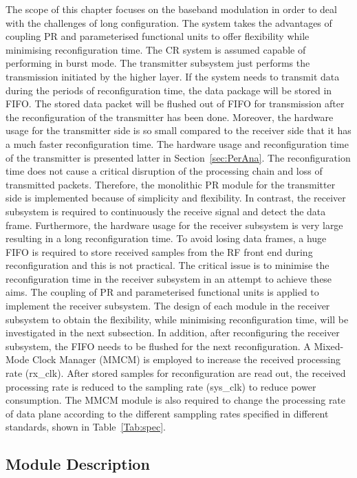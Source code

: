 The scope of this chapter focuses on the baseband modulation in order to deal with the challenges of long configuration. 
The system takes the advantages of coupling PR and parameterised functional units to offer flexibility while minimising reconfiguration time.
The CR system is assumed capable of performing in burst mode. 
The transmitter subsystem just performs the transmission initiated by the higher layer.
If the system needs to transmit data during the periods of reconfiguration time, the data package will be stored in FIFO. 
The stored data packet will be flushed out of FIFO for transmission after the reconfiguration of the transmitter has been done.
Moreover, the hardware usage for the transmitter side is so small compared to the receiver side that it has a much faster reconfiguration time.
The hardware usage and reconfiguration time of the transmitter is presented latter in Section~\ref{sec:PerAna}.
The reconfiguration time does not cause a critical disruption of the processing chain and loss of transmitted packets.
Therefore, the monolithic PR module for the transmitter side is implemented because of simplicity and flexibility.
In contrast, the receiver subsystem is required to continuously the receive signal and detect the data frame.
Furthermore, the hardware usage for the receiver subsystem is very large resulting in a long reconfiguration time.
To avoid losing data frames, a huge FIFO is required to store received samples from the RF front end during reconfiguration and this is not practical.
The critical  issue is to minimise the reconfiguration time in the receiver subsystem in an attempt to achieve these aims.
The coupling of PR and parameterised functional units is applied to implement the receiver subsystem. 
The design of each module in the receiver subsystem to obtain the flexibility, while minimising reconfiguration time, will be investigated in the next subsection.
In addition, after reconfiguring the receiver subsystem, the FIFO needs to be flushed for the next reconfiguration. 
A Mixed-Mode Clock Manager (MMCM) is employed to increase the received processing rate (rx\_clk).
After stored samples for reconfiguration are read out, the received processing rate is reduced to the sampling rate (sys\_clk) to reduce power consumption.
The MMCM module is also required to change the processing rate of data plane according to the different samppling rates specified in different standards, shown in Table~\ref{Tab:spec}.

	\subsection{Module Description}

